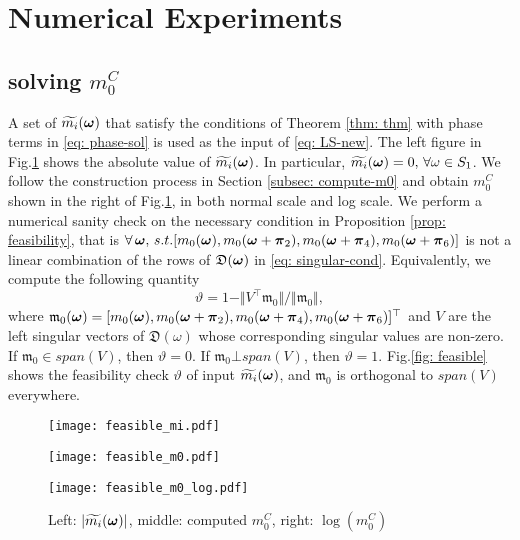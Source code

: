 \section{Numerical Experiments}
\subsection{solving $m_0^C$}
A set of $\widetilde{m_{i}}(\boldsymbol{\omega})$ that satisfy the conditions of Theorem \ref{thm: thm} with phase terms in \eqref{eq: phase-sol} is used as the input of \eqref{eq: LS-new}.
The left figure in Fig.\ref{fig: tm_i_m_0} shows the absolute value of $\widetilde{m_{i}}(\boldsymbol{\omega})$. In particular, $\widetilde{m_{i}}(\boldsymbol{\omega}) =0,\,\forall \omega\in S_1$. 
We follow the construction process in Section \ref{subsec: compute-m0} and obtain $m_0^C$ shown in the right of Fig.\ref{fig: tm_i_m_0}, in both normal scale and log scale.  
We perform a numerical sanity check on the necessary condition in Proposition \ref{prop: feasibility}, that is $\forall\,\boldsymbol{\omega}, \,s.t. [m_0(\boldsymbol{\omega}), m_0(\boldsymbol{\omega}+\boldsymbol{\pi}_2),m_0(\boldsymbol{\omega}+\boldsymbol{\pi}_4),m_0(\boldsymbol{\omega}+\boldsymbol{\pi}_6)]$ is not a linear combination of the rows of $\mathfrak{D}(\boldsymbol{\omega})$ in \eqref{eq: singular-cond}. Equivalently, we compute the following quantity $$\vartheta = 1 - \Vert V^\top\mathfrak{m}_0 \Vert/\Vert \mathfrak{m}_0\Vert ,$$ where $\mathfrak{m}_0(\boldsymbol{\omega})=[m_0(\boldsymbol{\omega}), m_0(\boldsymbol{\omega}+\boldsymbol{\pi}_2),m_0(\boldsymbol{\omega}+\boldsymbol{\pi}_4),m_0(\boldsymbol{\omega}+\boldsymbol{\pi}_6)]^\top$ and $V$ are the left singular vectors of $\mathfrak{D}(\omega)$ whose corresponding singular values are non-zero. If $\mathfrak{m}_0\in span(V)$, then $\vartheta = 0$. If $\mathfrak{m}_0\bot span(V)$, then $\vartheta = 1$.
Fig.\ref{fig: feasible} shows the feasibility check $\vartheta$ of input $\widetilde{m_{i}}(\boldsymbol{\omega})$, and $\mathfrak{m}_0$ is orthogonal to $span(V)$ everywhere.

\begin{figure}
\centering
\begin{minipage}[c]{.48\textwidth}
\texttt{[image: feasible\_mi.pdf]}
\end{minipage}
\begin{minipage}[c]{.22\textwidth}
\centering
\texttt{[image: feasible\_m0.pdf]}
\end{minipage}
\begin{minipage}[c]{.28\textwidth}
\centering
\texttt{[image: feasible\_m0\_log.pdf]}
\end{minipage}
\caption{Left:  $|\widetilde{m_{i}}(\boldsymbol{\omega})|$, middle: computed $m_0^C$, right: $\log(m_0^C)$}
\label{fig: tm_i_m_0}
\end{figure}

